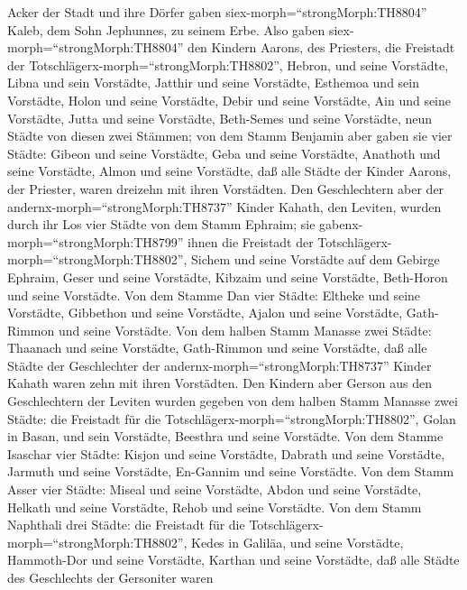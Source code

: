 Acker der Stadt und ihre Dörfer gaben siex-morph=``strongMorph:TH8804''
Kaleb, dem Sohn Jephunnes, zu seinem Erbe.  Also gaben
siex-morph=``strongMorph:TH8804'' den Kindern Aarons, des Priesters, die
Freistadt der Totschlägerx-morph=``strongMorph:TH8802'', Hebron, und
seine Vorstädte, Libna und sein Vorstädte,  Jatthir und
seine Vorstädte, Esthemoa und sein Vorstädte,  Holon und
seine Vorstädte, Debir und seine Vorstädte,  Ain und seine
Vorstädte, Jutta und seine Vorstädte, Beth-Semes und seine Vorstädte,
neun Städte von diesen zwei Stämmen;  von dem Stamm
Benjamin aber gaben sie vier Städte: Gibeon und seine Vorstädte, Geba
und seine Vorstädte,  Anathoth und seine Vorstädte, Almon
und seine Vorstädte,  daß alle Städte der Kinder Aarons,
der Priester, waren dreizehn mit ihren Vorstädten.  Den
Geschlechtern aber der andernx-morph=``strongMorph:TH8737'' Kinder
Kahath, den Leviten, wurden durch ihr Los vier Städte von dem Stamm
Ephraim;  sie gabenx-morph=``strongMorph:TH8799'' ihnen die
Freistadt der Totschlägerx-morph=``strongMorph:TH8802'', Sichem und
seine Vorstädte auf dem Gebirge Ephraim, Geser und seine Vorstädte,
 Kibzaim und seine Vorstädte, Beth-Horon und seine
Vorstädte.  Von dem Stamme Dan vier Städte: Eltheke und
seine Vorstädte, Gibbethon und seine Vorstädte,  Ajalon und
seine Vorstädte, Gath-Rimmon und seine Vorstädte.  Von dem
halben Stamm Manasse zwei Städte: Thaanach und seine Vorstädte,
Gath-Rimmon und seine Vorstädte,  daß alle Städte der
Geschlechter der andernx-morph=``strongMorph:TH8737'' Kinder Kahath
waren zehn mit ihren Vorstädten.  Den Kindern aber Gerson
aus den Geschlechtern der Leviten wurden gegeben von dem halben Stamm
Manasse zwei Städte: die Freistadt für die
Totschlägerx-morph=``strongMorph:TH8802'', Golan in Basan, und sein
Vorstädte, Beesthra und seine Vorstädte.  Von dem Stamme
Isaschar vier Städte: Kisjon und seine Vorstädte, Dabrath und seine
Vorstädte,  Jarmuth und seine Vorstädte, En-Gannim und
seine Vorstädte.  Von dem Stamm Asser vier Städte: Miseal
und seine Vorstädte, Abdon und seine Vorstädte,  Helkath
und seine Vorstädte, Rehob und seine Vorstädte.  Von dem
Stamm Naphthali drei Städte: die Freistadt für die
Totschlägerx-morph=``strongMorph:TH8802'', Kedes in Galiläa, und seine
Vorstädte, Hammoth-Dor und seine Vorstädte, Karthan und seine Vorstädte,
 daß alle Städte des Geschlechts der Gersoniter waren
